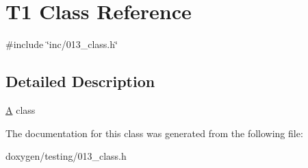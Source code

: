 \hypertarget{class_t1}{}\section{T1 Class Reference}
\label{class_t1}


{\ttfamily \#include \char`\"{}inc/013\+\_\+class.\+h\char`\"{}}



\subsection{Detailed Description}
\mbox{\hyperlink{class_a}{A}} class 

The documentation for this class was generated from the following file\+:\begin{DoxyCompactItemize}
\item 
doxygen/testing/013\+\_\+class.\+h\end{DoxyCompactItemize}
